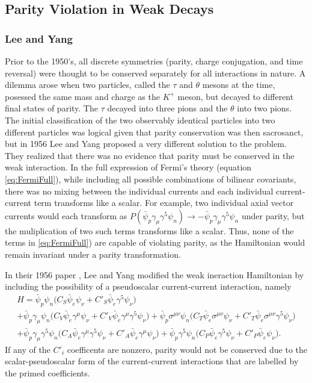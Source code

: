 \subsection{Parity Violation in Weak Decays}

\subsubsection{Lee and Yang}

Prior to the 1950's, all discrete symmetries (parity, charge conjugation, and time reversal)
were thought to be conserved separately for all interactions in nature. A dilemma arose when
two particles, called the $\tau$ and $\theta$ mesons at the time, posessed the same mass
and charge as the $K^+$ meson, but decayed to different final states of parity. The $\tau$ decayed into three pions
and the $\theta$ into two pions. The initial classification of the two observably identical particles into
two different particles was logical given that parity conservation was then sacrosanct,
but in 1956 Lee and Yang proposed a very different solution to the problem. They realized that
there was no evidence that parity must be conserved in the weak interaction.
In the full expression of Fermi's theory (equation \ref{eq:FermiFull}),
while including all possible combinations of bilinear covariants, there was no mixing between the
individual currents and each individual current-current term transforms like a scalar. For example,
two individual axial vector currents would each transform as
$P(\bar{\psi}_p \gamma_\mu \gamma^5 \psi_n) \rightarrow -\bar{\psi}_p \gamma_\mu \gamma^5 \psi_n$ under parity, but the
muliplication of two such terms transforms like a scalar. Thus, none of the terms in \ref{eq:FermiFull})
are capable of violating parity, as the Hamiltonian would remain invariant under a parity transformation. 

In their 1956 paper \cite{leeyang1956}, Lee and Yang modified the weak ineraction Hamiltonian
by including the possibility of a pseudoscalar current-current interaction, namely
%
\begin{multline}
  H = \bar{\psi}_p \psi_n \big( C_S\bar{\psi}_e  \psi_\nu + C'_S\bar{\psi}_e \gamma^5 \psi_\nu \big) \\
  + \bar{\psi}_p \gamma_\mu \psi_n  \big( C_V\bar{\psi}_e \gamma^\mu \psi_\nu + C'_V\bar{\psi}_e \gamma^\mu \gamma^5 \psi_\nu \big) 
  + \bar{\psi}_p \sigma^{\mu\nu} \psi_n \big( C_T\bar{\psi}_e \sigma^{\mu\nu} \psi_\nu + C'_T\bar{\psi}_e \sigma^{\mu\nu} \gamma^5 \psi_\nu \big)\\
  + \bar{\psi}_p \gamma_\mu \gamma^5 \psi_n \big( C_A\bar{\psi}_e \gamma^\mu \gamma^5 \psi_\nu + C'_A\bar{\psi}_e \gamma^\mu \psi_\nu \big) 
  + \bar{\psi}_p  \gamma^5 \psi_n \big( C_P\bar{\psi}_e  \gamma^5 \psi_\nu + C'_P\bar{\psi}_e \psi_\nu \big).
  \label{eq:leeyang}
\end{multline}
%
If any of the $C'_i$ coefficents are nonzero, parity would not be conserved due to
the scalar-pseudoscalar form of the current-current interactions that are labelled by
the primed coefficients.

